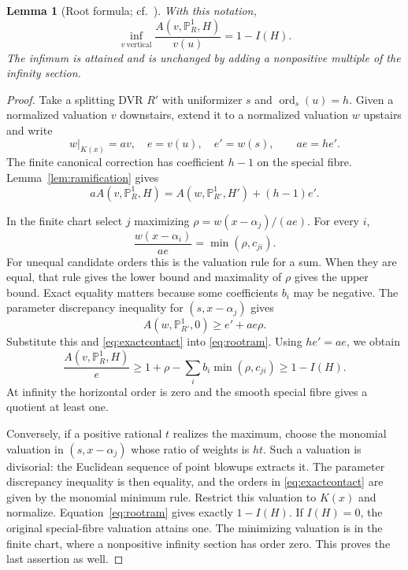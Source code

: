\documentclass[11pt,reqno]{amsart}
\numberwithin{equation}{section}
\newtheorem{lemma}[theorem]{Lemma}
\theoremstyle{definition}
\theoremstyle{remark}
\newcommand{\PP}{\mathbb P}
\newcommand{\ord}{\operatorname{ord}}
\begin{document}
\begin{lemma}[Root formula; cf.\ {\cite[Proposition~4.1]{Jiao}}]\label{lem:root}
With this notation,
\begin{equation}\label{eq:rootthreshold}
 \inf_{v\ \mathrm{vertical}}
 \frac{A(v,\PP^1_R,H)}{v(u)}=1-I(H).
\end{equation}
The infimum is attained and is unchanged by adding a nonpositive multiple of the infinity section.
\end{lemma}
\begin{proof}
Take a splitting DVR $R'$ with uniformizer $s$ and $\ord_s(u)=h$. Given a normalized valuation $v$ downstairs, extend it to a normalized valuation $w$ upstairs and write
\[
 w|_{K(x)}=av,\quad e=v(u),\quad e'=w(s),
 \qquad ae=he'.
\]
The finite canonical correction has coefficient $h-1$ on the special fibre. Lemma~\ref{lem:ramification} gives
\begin{equation}\label{eq:rootram}
 aA(v,\PP^1_R,H)
 =A(w,\PP^1_{R'},H')+(h-1)e'.
\end{equation}

In the finite chart select $j$ maximizing $\rho=w(x-\alpha_j)/(ae)$. For every $i$,
\begin{equation}\label{eq:exactcontact}
 \frac{w(x-\alpha_i)}{ae}=\min(\rho,c_{ji}).
\end{equation}
For unequal candidate orders this is the valuation rule for a sum. When they are equal, that rule gives the lower bound and maximality of $\rho$ gives the upper bound. Exact equality matters because some coefficients $b_i$ may be negative. The parameter discrepancy inequality for $(s,x-\alpha_j)$ gives
\[
 A(w,\PP^1_{R'},0)\ge e'+ae\rho.
\]
Substitute this and \eqref{eq:exactcontact} into \eqref{eq:rootram}. Using $he'=ae$, we obtain
\[
 \frac{A(v,\PP^1_R,H)}e
 \ge1+\rho-\sum_i b_i\min(\rho,c_{ji})\ge1-I(H).
\]
At infinity the horizontal order is zero and the smooth special fibre gives a quotient at least one.

Conversely, if a positive rational $t$ realizes the maximum, choose the monomial valuation in $(s,x-\alpha_j)$ whose ratio of weights is $ht$. Such a valuation is divisorial: the Euclidean sequence of point blowups extracts it. The parameter discrepancy inequality is then equality, and the orders in \eqref{eq:exactcontact} are given by the monomial minimum rule. Restrict this valuation to $K(x)$ and normalize. Equation~\eqref{eq:rootram} gives exactly $1-I(H)$. If $I(H)=0$, the original special-fibre valuation attains one. The minimizing valuation is in the finite chart, where a nonpositive infinity section has order zero. This proves the last assertion as well.
\end{proof}
\end{document}
